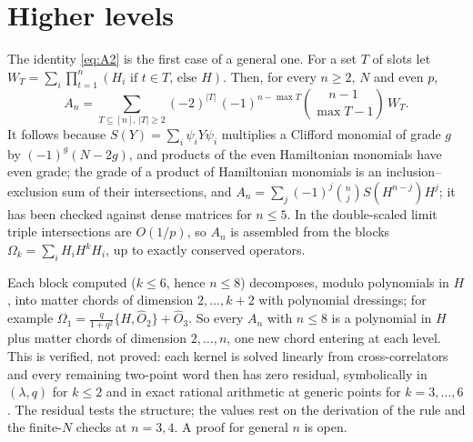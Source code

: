 \documentclass[11pt]{article}
\begin{document}
\section{Higher levels}

The identity \eqref{eq:A2} is the first case of a general one. For a set
$T$ of slots let $W_T=\sum_i\prod_{t=1}^n(H_i\text{ if }t\in T\text{,
else }H)$. Then, for every $n\ge2$, $N$ and even $p$,
\begin{equation}
A_n=\sum_{T\subseteq[n],\,|T|\ge2}(-2)^{|T|}\,(-1)^{n-\max T}
\binom{n-1}{\max T-1}\,W_T .
\end{equation}
It follows because $S(Y)=\sum_i\psi_iY\psi_i$ multiplies a Clifford
monomial of grade $g$ by $(-1)^g(N-2g)$, and products of the even
Hamiltonian monomials have even grade; the grade of a product of Hamiltonian
monomials is an inclusion--exclusion sum of their intersections, and
$A_n=\sum_j(-1)^j\binom{n}{j}S(H^{n-j})H^j$; it has been checked
against dense matrices for $n\le5$. In the double-scaled limit triple
intersections are $O(1/p)$, so $A_n$ is assembled from the blocks
$\Omega_k=\sum_iH_iH^kH_i$, up to exactly conserved operators.

Each block computed ($k\le6$, hence $n\le8$) decomposes, modulo
polynomials in $H$, into matter chords of dimension $2,\dots,k+2$ with
polynomial dressings; for example
$\Omega_1=\frac{q}{1+q^2}\{H,\hat O_2\}+\hat O_3$. So every $A_n$ with
$n\le8$ is a polynomial in $H$ plus matter chords of dimension
$2,\dots,n$, one new chord entering at each level. This is verified,
not proved: each kernel is solved linearly from cross-correlators and
every remaining two-point word then has zero residual, symbolically in
$(\lambda,q)$ for $k\le2$ and in exact rational arithmetic at generic
points for $k=3,\dots,6$. The residual tests the structure; the values
rest on the derivation of the rule and the finite-$N$ checks at
$n=3,4$. A proof for general $n$ is open.
\end{document}
